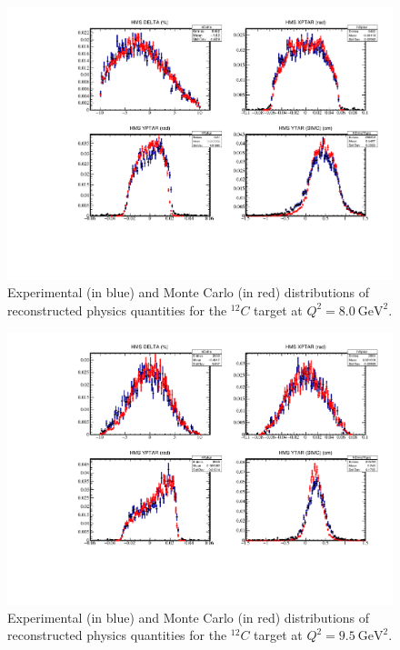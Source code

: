 \begin{figure}[!h]
    \centering
    \includegraphics[page=3,width=1.0\textwidth]{pass5_report/Report_c12_8.pdf}
    \caption{
            Experimental (in blue) and Monte Carlo (in red) distributions of
            reconstructed physics quantities for
            the ${}^{12}C$ target at $Q^2=\SI{8.0}{\giga\electronvolt\squared}$.
            }
    \label{fig:Report_c12_8.pdf}
\end{figure}


\begin{figure}[!h]
    \centering
    \includegraphics[page=3,width=1.0\textwidth]{pass5_report/Report_c95.pdf}
    \caption{
            Experimental (in blue) and Monte Carlo (in red) distributions of
            reconstructed physics quantities for
            the ${}^{12}C$ target at $Q^2=\SI{9.5}{\giga\electronvolt\squared}$.
            }
    \label{fig:Report_c95.pdf}
\end{figure}


